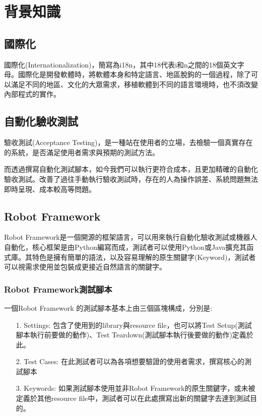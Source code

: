 \chapter{背景知識}

\section{國際化}
國際化(Internationalization)\cite{internationalization}，簡寫為i18n，其中18代表i和n之間的18個英文字母。國際化是開發軟體時，將軟體本身和特定語言、地區脫鉤的一個過程，除了可以滿足不同的地區、文化的大眾需求，移植軟體到不同的語言環境時，也不須改變內部程式的實作。

\section{自動化驗收測試}
驗收測試(Acceptance Testing)\cite{se}，是一種站在使用者的立場，去檢驗一個真實存在的系統，是否滿足使用者需求與預期的測試方法。

而透過撰寫自動化測試腳本\cite{AT}，如今我們可以執行更符合成本，且更加精確的自動化驗收測試。改善了過往手動執行驗收測試時，存在的人為操作誤差、系統問題無法即時呈現、成本較高等問題。
\section{Robot Framework}
Robot Framework\cite{rf}\cite{rfguide}是一個開源的框架語言，可以用來執行自動化驗收測試或機器人自動化，核心框架是由Python\cite{python}編寫而成，測試者可以使用Python或Java擴充其函式庫。其特色是擁有簡單的語法，以及容易理解的原生關鍵字(Keyword)，測試者可以視需求使用並包裝成更接近自然語言的關鍵字。

\subsection{Robot Framework測試腳本}
一個Robot Framework 的測試腳本基本上由三個區塊構成，分別是:
\begin{itemize}
    \item[1.]Settings: 包含了使用到的library與resource file，也可以將Test Setup(測試腳本執行前要做的動作)、Test Teardown(測試腳本執行後要做的動作)定義於此。
    \item[2.]Test Cases: 在此測試者可以為各項想要驗證的使用者需求，撰寫核心的測試腳本
    \item[3.]Keywords: 如果測試腳本使用並非Robot Framework的原生關鍵字，或未被定義於其他resource file中，測試者可以在此處撰寫出新的關鍵字去達到測試目的。
\end{itemize}

